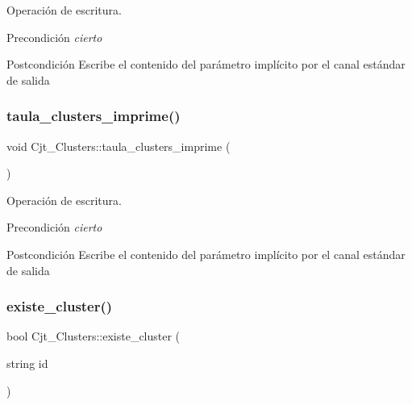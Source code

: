 Operación de escritura. 

\begin{DoxyPrecond}{Precondición}
{\itshape cierto} 
\end{DoxyPrecond}
\begin{DoxyPostcond}{Postcondición}
Escribe el contenido del parámetro implícito por el canal estándar de salida 
\end{DoxyPostcond}
\mbox{\label{class_cjt___clusters_a6a261f0f5ca471e257d6b17e91b4887a}} 
\subsubsection{\texorpdfstring{taula\+\_\+clusters\+\_\+imprime()}{taula\_clusters\_imprime()}}
{\footnotesize\ttfamily void Cjt\+\_\+\+Clusters\+::taula\+\_\+clusters\+\_\+imprime (\begin{DoxyParamCaption}{ }\end{DoxyParamCaption})}



Operación de escritura. 

\begin{DoxyPrecond}{Precondición}
{\itshape cierto} 
\end{DoxyPrecond}
\begin{DoxyPostcond}{Postcondición}
Escribe el contenido del parámetro implícito por el canal estándar de salida 
\end{DoxyPostcond}
\mbox{\label{class_cjt___clusters_a4fcda36a68e8fe48d787dfd14e9b222b}} 
\subsubsection{\texorpdfstring{existe\+\_\+cluster()}{existe\_cluster()}}
{\footnotesize\ttfamily bool Cjt\+\_\+\+Clusters\+::existe\+\_\+cluster (\begin{DoxyParamCaption}\item[{string}]{id }\end{DoxyParamCaption})}



